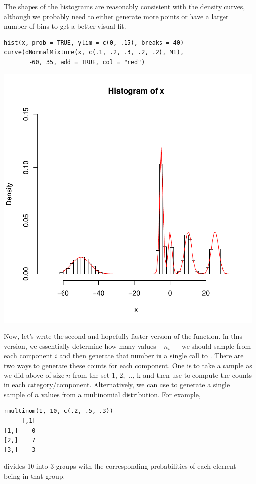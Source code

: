 The shapes of the histograms are reasonably
consistent with the density curves, although
we probably need to either generate more
points or have a larger number of bins to get a better
visual fit.
\begin{verbatim}
hist(x, prob = TRUE, ylim = c(0, .15), breaks = 40)
curve(dNormalMixture(x, c(.1, .2, .3, .2, .2), M1), 
       -60, 35, add = TRUE, col = "red")
\end{verbatim}
\includegraphics{RNG/images/mixtureSample1a.pdf}

Now, let's write the second and hopefully faster version of the
 function.  In this version, we essentially
determine how many values -- $n_i$ --- we should sample from each
component $i$ and then generate that number in a single call to
.  There are two ways to generate these counts for
each component. One is to take a sample as we did above of size $n$
from the set 1, 2, $\ldots$, k and then use  to
compute the counts in each category/component.  Alternatively, we can
use  to generate a single sample of $n$ values
from a multinomial distribution.
For example, 
\begin{verbatim}
rmultinom(1, 10, c(.2, .5, .3))
     [,1]
[1,]    0
[2,]    7
[3,]    3
\end{verbatim}
divides 10 into 3 groups with the corresponding probabilities of each
element being in that group.

